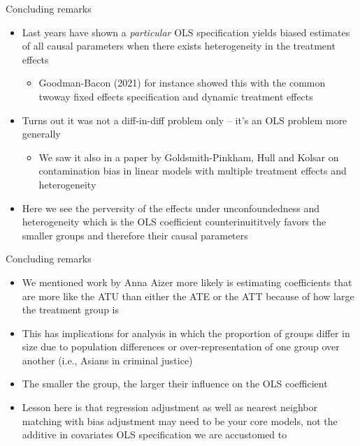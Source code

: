 \documentclass{beamer}
\begin{document}
\begin{frame}{Concluding remarks}

\begin{itemize}

\item Last years have shown a \emph{particular} OLS specification yields biased estimates of all causal parameters when there exists heterogeneity in the treatment effects
	\begin{itemize}
	\item Goodman-Bacon (2021) for instance showed this with the common twoway fixed effects specification and dynamic treatment effects
	\end{itemize}
\item Turns out it was not a diff-in-diff problem only -- it's an OLS problem more generally
	\begin{itemize}
	\item We saw it also in a paper by Goldsmith-Pinkham, Hull and Kolsar on contamination bias in linear models with multiple treatment effects and heterogeneity
	\end{itemize}
\item Here we see the perversity of the effects under unconfoundedness and heterogeneity which is the OLS coefficient counterinuititvely favors the smaller groups and therefore their causal parameters
\end{itemize}

\end{frame}

\begin{frame}{Concluding remarks}

\begin{itemize}

\item We mentioned work by Anna Aizer more likely is estimating coefficients that are more like the ATU than either the ATE or the  ATT because of how large the treatment group is
\item This has implications for analysis in which the proportion of groups differ in size due to population differences or over-representation of one group over another (i.e., Asians in criminal justice)
\item The smaller the group, the larger their influence on the OLS coefficient
\item Lesson here is that regression adjustment as well as nearest neighbor matching with bias adjustment may need to be your core models, not the additive in covariates OLS specification we are accustomed to

\end{itemize}

\end{frame}
\end{document}

